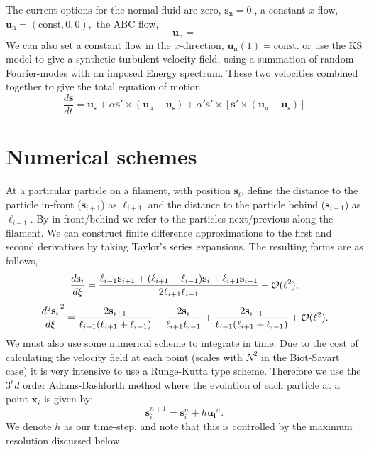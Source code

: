\documentclass[12pt]{article}
\newcommand{\bs}{\mathbf{s}}
\newcommand{\bu}{\mathbf{u}}
\begin{document}
  The current options for the normal fluid are zero, $\bs_\mathrm{n}=0.$, a constant $x$-flow, 
  $\bu_\mathrm{n}=(\mathrm{const},0,0),$ the ABC flow,
  \begin{equation} 
    \bu_\mathrm{n}=
  \end{equation}
  We can also set a constant flow in the $x$-direction, $\bu_\mathrm{n}(1)=\mathrm{const.}$ or use the KS model to give a synthetic turbulent velocity field, using a summation of random Fourier-modes with an imposed Energy spectrum.
  These two velocities combined together to give the total equation of motion
  \begin{equation}
    \frac{d \bs}{dt}=\bu_\mathrm{s}+\alpha \bs' \times (\bu_\mathrm{n}-\bu_\mathrm{s})
    +\alpha' \bs' \times \left[ \bs' \times (\bu_\mathrm{n}-\bu_\mathrm{s})\right]
  \end{equation}  
\section{Numerical schemes}\label{Sec:num}
  At a particular particle on a filament, with position $\bs_i$, define the distance to the particle in-front ($\bs_{i+1}$)
  as $\ell_{i+1}$ and the distance to the particle behind ($\bs_{i-1}$) as $\ell_{i-1}$.
  By in-front/behind we refer to the particles next/previous along the filament.
  We can construct finite difference approximations to the first and second derivatives by taking Taylor's series expansions.
  The resulting forms are as follows,
  \begin{equation}
    \frac{d \bs_i}{d \xi}=\frac{\ell_{i-1}\bs_{i+1}+(\ell_{i+1}-\ell_{i-1})\bs_i+\ell_{i+1}\bs_{i-1}}
    {2\ell_{i+1}\ell_{i-1}}+{\cal O}(\ell^2),
  \end{equation}
  \begin{equation}
    \frac{d^2 \bs_i}{d \xi}^2=\frac{2\bs_{i+1}}{\ell_{i+1}(\ell_{i+1}+\ell_{i-1})}-\frac{2\bs_i}{\ell_{i+1}\ell_{i-1}}+\frac{2\bs_{i-1}}{\ell_{i-1}(\ell_{i+1}+\ell_{i-1})}+{\cal O}(\ell^2).
  \end{equation}
  We must also use some numerical scheme to integrate in time. Due to the cost of calculating the velocity field at each point (scales with $N^2$ in the Biot-Savart case) it is very intensive to use a Runge-Kutta type scheme. 
Therefore we use the $3^rd$ order Adams-Bashforth method where the evolution of each particle at a point $\mathbf{x}_i$ is given by:
\begin{equation}
  \mathbf{s}_i^{n+1}=\mathbf{s}_i^{n}+h\mathbf{u_i}^n.
\end{equation}
We denote $h$ as our time-step, and note that this is controlled by the maximum resolution discussed below.
\end{document}
